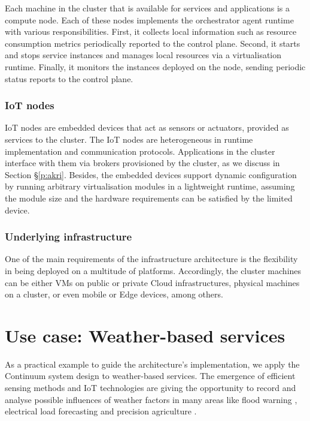 Each machine in the cluster that is available for services and applications is a compute node. Each of these nodes implements the orchestrator agent runtime with various responsibilities. First, it collects local information such as resource consumption metrics periodically reported to the control plane. Second, it starts and stops service instances and manages local resources via a virtualisation runtime. Finally, it monitors the instances deployed on the node, sending periodic status reports to the control plane.

\subsubsection{IoT nodes}

IoT nodes are embedded devices that act as sensors or actuators, provided as services to the cluster. The IoT nodes are heterogeneous in runtime implementation and communication protocols. Applications in the cluster interface with them via brokers provisioned by the cluster, as we discuss in Section §\ref{p:akri}. Besides, the embedded devices support dynamic configuration by running arbitrary virtualisation modules in a lightweight runtime, assuming the module size and the hardware requirements can be satisfied by the limited device.

\subsubsection{Underlying infrastructure}

One of the main requirements of the infrastructure architecture is the flexibility in being deployed on a multitude of platforms. Accordingly, the cluster machines can be either VMs on public or private Cloud infrastructures, physical machines on a cluster, or even mobile or Edge devices, among others.

\section{Use case: Weather-based services}

As a practical example to guide the architecture's implementation, we apply the Continuum system design to weather-based services. The emergence of efficient sensing methods and IoT technologies are giving the opportunity to record and analyse possible influences of weather factors in many areas like flood warning \cite{brzoza2016embedded}, electrical load forecasting \cite{weather-load-forecasting} and precision agriculture \cite{keswani2019adapting}.

